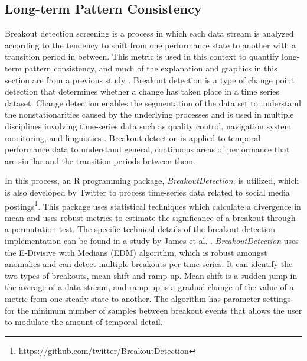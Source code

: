 \subsection{Long-term Pattern Consistency}
\label{sec:patternconsistency}

Breakout detection screening is a process in which each data stream is analyzed according to the tendency to shift from one performance state to another with a transition period in between. This metric is used in this context to quantify long-term pattern consistency, and much of the explanation and graphics in this section are from a previous study \citep{miller_forensically_2015}. Breakout detection is a type of change point detection that determines whether a change has taken place in a time series dataset. Change detection enables the segmentation of the data set to understand the nonstationarities caused by the underlying processes and is used in multiple disciplines involving time-series data such as quality control, navigation system monitoring, and linguistics \citep{basseville_detection_1993}. Breakout detection is applied to temporal performance data to understand general, continuous areas of performance that are similar and the transition periods between them.

In this process, an R programming package, \emph{BreakoutDetection}, is utilized, which is also developed by Twitter to process time-series data related to social media postings\footnote{https://github.com/twitter/BreakoutDetection}. This package uses statistical techniques which calculate a divergence in mean and uses robust metrics to estimate the significance of a breakout through a permutation test. The specific technical details of the breakout detection implementation can be found in a study by James et al. \citep{james2014leveraging}. \emph{BreakoutDetection} uses the E-Divisive with Medians (EDM) algorithm, which is robust amongst anomalies and can detect multiple breakouts per time series. It can identify the two types of breakouts, mean shift and ramp up. Mean shift is a sudden jump in the average of a data stream, and ramp up is a gradual change of the value of a metric from one steady state to another. The algorithm has parameter settings for the minimum number of samples between breakout events that allows the user to modulate the amount of temporal detail.

